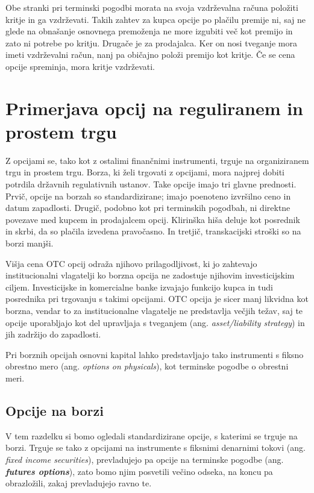 \documentclass[a4paper]{article}
\begin{document}
Obe stranki pri terminski pogodbi morata na svoja vzdrževalna računa položiti kritje in ga vzdrževati. Takih zahtev za kupca opcije
po plačilu premije ni, saj ne glede na obnašanje osnovnega premoženja ne more izgubiti več kot premijo in zato ni potrebe po kritju.
Drugače je za prodajalca. Ker on nosi tveganje mora imeti vzdrževalni račun, nanj pa običajno položi premijo kot kritje. Če se cena 
opcije spreminja, mora kritje vzdrževati.

\section{Primerjava opcij na reguliranem in prostem trgu}
Z opcijami se, tako kot z ostalimi finančnimi instrumenti, trguje na organiziranem trgu in prostem trgu. Borza, ki želi trgovati
z opcijami, mora najprej dobiti potrdila državnih regulativnih ustanov. Take opcije imajo tri glavne prednosti. Prvič, opcije na borzah
so standardizirane; imajo poenoteno izvršilno ceno in datum zapadlosti. Drugič, podobno kot pri terminskih pogodbah, ni direktne povezave
med kupcem in prodajalcem opcij. Klirinška hiša deluje kot posrednik in skrbi, da so plačila izvedena pravočasno. In tretjič, transkacijski
stroški so na borzi manjši. 

Višja cena OTC opcij odraža njihovo prilagodljivost, ki jo zahtevajo institucionalni vlagatelji ko borzna opcija ne zadostuje
njihovim investicijskim ciljem. Investicijske in komercialne banke izvajajo funkcijo kupca in tudi posrednika pri trgovanju s takimi
opcijami. OTC opcija je sicer manj likvidna kot borzna, vendar to za institucionalne vlagatelje ne predstavlja večjih težav, 
saj te opcije uporabljajo kot del upravljaja s tveganjem (ang. \textit{asset/liability strategy}) in jih zadržijo do zapadlosti.

Pri borznih opcijah osnovni kapital lahko predstavljajo tako instrumenti s fiksno obrestno mero (ang. \textit{options on physicals}),
kot terminske pogodbe o obrestni meri.

\subsection{Opcije na borzi}
V tem razdelku si bomo ogledali standardizirane opcije, s katerimi se trguje na borzi. Trguje se 
tako z opcijami na instrumente s fiksnimi denarnimi tokovi (ang. \textit{fixed income securities}), 
prevladujejo pa opcije na terminske pogodbe (ang. \textit{\textbf{futures options}}),
zato bomo njim posvetili večino odseka, na koncu pa obrazložili, zakaj prevladujejo ravno te.
\end{document}

